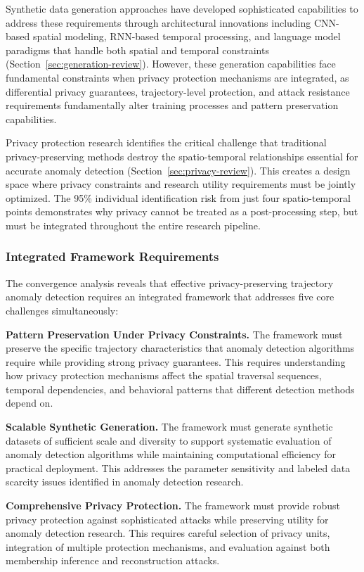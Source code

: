 \documentclass[runningheads]{llncs}
\begin{document}
Synthetic data generation approaches have developed sophisticated capabilities to address these requirements through architectural innovations including CNN-based spatial modeling, RNN-based temporal processing, and language model paradigms that handle both spatial and temporal constraints (Section~\ref{sec:generation-review}). However, these generation capabilities face fundamental constraints when privacy protection mechanisms are integrated, as differential privacy guarantees, trajectory-level protection, and attack resistance requirements fundamentally alter training processes and pattern preservation capabilities.

Privacy protection research identifies the critical challenge that traditional privacy-preserving methods destroy the spatio-temporal relationships essential for accurate anomaly detection (Section~\ref{sec:privacy-review}). This creates a design space where privacy constraints and research utility requirements must be jointly optimized. The 95\% individual identification risk from just four spatio-temporal points demonstrates why privacy cannot be treated as a post-processing step, but must be integrated throughout the entire research pipeline.

\subsubsection{Integrated Framework Requirements}

The convergence analysis reveals that effective privacy-preserving trajectory anomaly detection requires an integrated framework that addresses five core challenges simultaneously:

\textbf{Pattern Preservation Under Privacy Constraints.} The framework must preserve the specific trajectory characteristics that anomaly detection algorithms require while providing strong privacy guarantees. This requires understanding how privacy protection mechanisms affect the spatial traversal sequences, temporal dependencies, and behavioral patterns that different detection methods depend on.

\textbf{Scalable Synthetic Generation.} The framework must generate synthetic datasets of sufficient scale and diversity to support systematic evaluation of anomaly detection algorithms while maintaining computational efficiency for practical deployment. This addresses the parameter sensitivity and labeled data scarcity issues identified in anomaly detection research.

\textbf{Comprehensive Privacy Protection.} The framework must provide robust privacy protection against sophisticated attacks while preserving utility for anomaly detection research. This requires careful selection of privacy units, integration of multiple protection mechanisms, and evaluation against both membership inference and reconstruction attacks.
\end{document}
